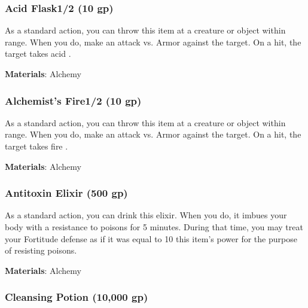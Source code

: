 
\lowercase{\hypertarget{item:Acid Flask}{}}\label{item:Acid Flask}
\hypertarget{item:Acid Flask}{\subsubsection{Acid Flask\hfill1/2 (10 gp)}}

As a standard action, you can throw this item at a creature or object within \rngclose range.
When you do, make an attack vs. Armor against the target.
On a hit, the target takes acid .



\vspace{0.25em}
\textbf{Materials}: Alchemy


\lowercase{\hypertarget{item:Alchemist's Fire}{}}\label{item:Alchemist's Fire}
\hypertarget{item:Alchemist's Fire}{\subsubsection{Alchemist's Fire\hfill1/2 (10 gp)}}

As a standard action, you can throw this item at a creature or object within \rngclose range.
When you do, make an attack vs. Armor against the target.
On a hit, the target takes fire .



\vspace{0.25em}
\textbf{Materials}: Alchemy


\lowercase{\hypertarget{item:Antitoxin Elixir}{}}\label{item:Antitoxin Elixir}
\hypertarget{item:Antitoxin Elixir}{\subsubsection{Antitoxin Elixir\hfill{} (500 gp)}}

As a standard action, you can drink this elixir.
When you do, it imbues your body with a resistance to poisons for 5 minutes.
During that time, you may treat your Fortitude defense as if it was equal to 10 \add this item's power for the purpose of resisting poisons.



\vspace{0.25em}
\textbf{Materials}: Alchemy


\lowercase{\hypertarget{item:Cleansing Potion}{}}\label{item:Cleansing Potion}
\hypertarget{item:Cleansing Potion}{\subsubsection{Cleansing Potion\hfill{} (10,000 gp)}}

